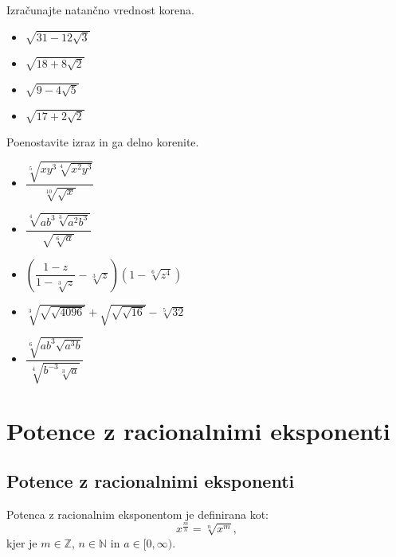         
            \begin{naloga}
                Izračunajte natančno vrednost korena.
                \begin{itemize}
                    \item $\displaystyle \sqrt{31-12\sqrt{3}}$ 
                    \item $\displaystyle \sqrt{18+8\sqrt{2}}$ 
                    \item $\displaystyle \sqrt{9-4\sqrt{5}}$ 
                    \item $\displaystyle \sqrt{17+2\sqrt{2}}$ 
                \end{itemize}
            \end{naloga}
        


        
            \begin{naloga}
                Poenostavite izraz in ga delno korenite.
                \begin{itemize}
                    \item $\displaystyle \dfrac{\sqrt[5]{xy^3\sqrt[4]{x^2y^3}}}{\sqrt[10]{\sqrt{x}}}$ 
                    \item $\displaystyle \dfrac{\sqrt[4]{ab^3\sqrt[3]{a^2b^3}}}{\sqrt{\sqrt[6]{a}}}$ 
                    \item $\displaystyle \left(\dfrac{1-z}{1-\sqrt[3]{z}}-\sqrt[3]{z}\right)\left(1-\sqrt[6]{z^4}\right)$ 
                    \item $\displaystyle \sqrt[3]{\sqrt{\sqrt{4096}}}+\sqrt{\sqrt{\sqrt{16}}}-\sqrt[5]{32}$ 
                    \item $\displaystyle \dfrac{\sqrt[6]{ab^3\sqrt{a^3b}}}{\sqrt[4]{b^{-3}\sqrt[3]{a}}}$ 
                \end{itemize}
            \end{naloga}
        



            \newpage
    \section{Potence z racionalnimi eksponenti}

        
            \subsection{Potence z racionalnimi eksponenti}

            Potenca z racionalnim eksponentom je definirana kot: 
                $$\displaystyle x^\frac{m}{n}=\sqrt[n]{x^m},$$
                kjer je $m\in\mathbb{Z}$, $n\in\mathbb{N}$ in $a\in[0,\infty)$.
            

